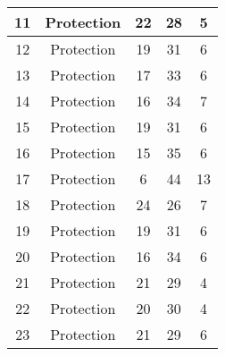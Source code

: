 \documentclass[results.tex]{subfiles}
\begin{document}
\begin{center}
\begin{tabular}{| c || c | c | c | c |}
            \hline
            11                      & Protection                   & 22                     & 28                      & 5                    \\
            \hline
            12                      & Protection                   & 19                     & 31                      & 6                    \\
            \hline
            13                      & Protection                   & 17                     & 33                      & 6                    \\
            \hline
            14                      & Protection                   & 16                     & 34                      & 7                    \\
            \hline
            15                      & Protection                   & 19                     & 31                      & 6                    \\
            \hline
            16                      & Protection                   & 15                     & 35                      & 6                    \\
            \hline
            17                      & Protection                   & 6                      & 44                      & 13                   \\
            \hline
            18                      & Protection                   & 24                     & 26                      & 7                    \\
            \hline
            19                      & Protection                   & 19                     & 31                      & 6                    \\
            \hline
            20                      & Protection                   & 16                     & 34                      & 6                    \\
            \hline
            21                      & Protection                   & 21                     & 29                      & 4                    \\
            \hline
            22                      & Protection                   & 20                     & 30                      & 4                    \\
            \hline
            23                      & Protection                   & 21                     & 29                      & 6                    \\

\end{tabular}
\end{center}
\end{document}
